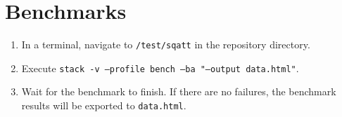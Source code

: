 \section{Benchmarks}

\begin{enumerate}
\item In a terminal, navigate to \texttt{/test/sqatt} in the repository directory.
\item Execute \texttt{stack -v --profile bench --ba "--output data.html"}.
\item Wait for the benchmark to finish.
If there are no failures, the benchmark results will be exported to \texttt{data.html}.
\end{enumerate}

